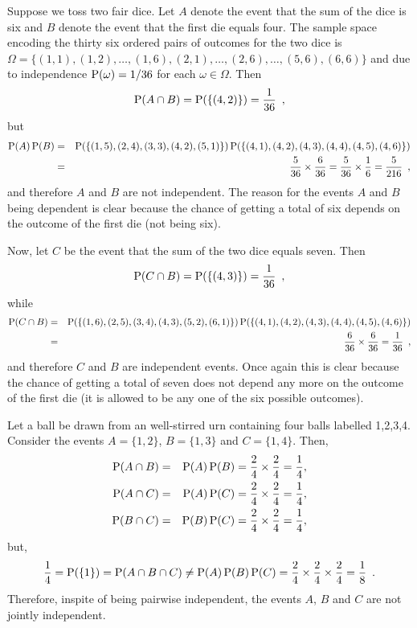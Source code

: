 \begin{example}\label{EX:depAndindep} 
Suppose we toss two fair dice.  
Let $A$ denote the event that the sum of the dice is six and $B$ denote the event that the first die equals four.  The sample space encoding the thirty six ordered pairs of outcomes for the two dice is $\Omega = \{ (1,1), (1,2), \ldots, (1,6), (2,1), \ldots, (2,6), \ldots, (5,6), (6,6)\}$ and due to independence $\P(\omega)=1/36$ for each $\omega\in\Omega$.  
Then 
\[
\P(A \cap B)  = \P (\{(4,2)\}) = \frac{1}{36} \enspace ,
\]
but
\begin{eqnarray*}
\P(A)\P(B) 
&=& \P (\{(1,5),(2,4),(3,3),(4,2),(5,1)\}) \P( \{ (4,1),(4,2),(4,3),(4,4),(4,5),(4,6) \}) \\
&=& \frac{5}{36}\times \frac{6}{36} = \frac{5}{36}\times\frac{1}{6} = \frac{5}{216} \enspace ,
\end{eqnarray*}
and therefore $A$ and $B$ are not independent.  
The reason for the events $A$ and $B$ being dependent is clear because the chance of getting a total of six depends on the outcome of the first die (not being six).

Now, let $C$ be the event that the sum of the two dice equals seven.  
Then
\[
\P(C \cap B)  = \P (\{(4,3)\}) = \frac{1}{36} \enspace ,
\]
while
\begin{eqnarray*}
\P(C \cap B)  
&=& \P (\{(1,6),(2,5),(3,4),(4,3),(5,2),(6,1)\}) \P( \{ (4,1),(4,2),(4,3),(4,4),(4,5),(4,6) \})\\
&=& \frac{6}{36}\times\frac{6}{36}= \frac{1}{36} \enspace ,
\end{eqnarray*}
and therefore $C$ and $B$ are independent events.  Once again this is clear because the chance of getting a total of seven does not depend any more on the outcome of the first die (it is allowed to be any one of the six possible outcomes). 
\end{example}


\begin{example}\label{EX:2indButNotMutind}
Let a ball be drawn from an well-stirred urn containing four balls labelled 1,2,3,4.  
Consider the events $A = \{1,2\}$, $B=\{1,3\}$ and $C=\{1,4\}$.  
Then,
\begin{eqnarray*}
\P(A \cap B) &=& \P(A)\P(B) = \frac{2}{4}\times\frac{2}{4} = \frac{1}{4},\\
\P(A \cap C) &=& \P(A)\P(C) = \frac{2}{4}\times\frac{2}{4} = \frac{1}{4},\\
\P(B \cap C) &=& \P(B)\P(C) = \frac{2}{4}\times\frac{2}{4} = \frac{1}{4},
\end{eqnarray*}
but,
\[
\frac{1}{4} = \P(\{1\}) = \P (A \cap B \cap C) \neq \P(A)\P(B)\P(C) = \frac{2}{4}\times\frac{2}{4}\times\frac{2}{4}=\frac{1}{8} \enspace .
\]
Therefore, inspite of being pairwise independent, the events $A$, $B$ and $C$ are not jointly independent.
\end{example}

